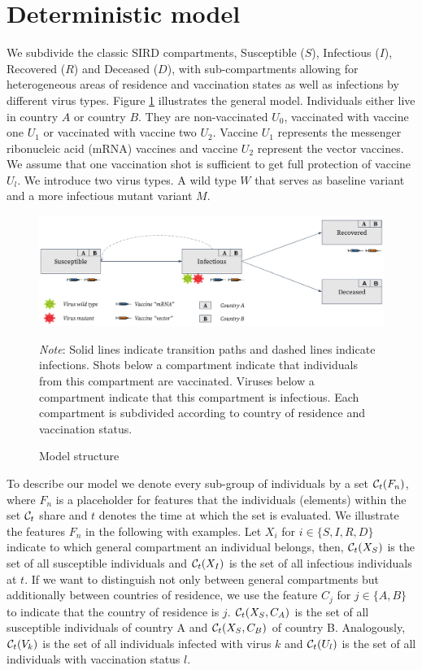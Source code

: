 \section{Deterministic model}
\label{sec:model}
We subdivide the classic SIRD compartments, Susceptible ($S$), Infectious ($I$), Recovered ($R$) and Deceased ($D$), with sub-compartments allowing for heterogeneous areas of residence and vaccination states as well as infections by different virus types. Figure \ref{fig:model} illustrates the general model. Individuals either live in country $A$ or country $B$. They are non-vaccinated $U_0$, vaccinated with vaccine one $U_1$ or vaccinated with vaccine two $U_2$. Vaccine $U_1$ represents the messenger ribonucleic acid (mRNA) vaccines and vaccine $U_2$ represent the vector vaccines. We assume that one vaccination shot is sufficient to get full protection of vaccine $U_l$. We introduce two virus types. A wild type $W$ that serves as baseline variant and a more infectious mutant variant $M$.\\
\begin{figure}[h!]
\centering
\includegraphics[scale=0.3]{images/vaccination_pp_blue_orange.png}\\
\begin{flushleft}
\scriptsize{\textit{Note}: Solid lines indicate transition paths and dashed lines indicate infections. Shots below a compartment indicate that individuals from this compartment are vaccinated. Viruses below a compartment indicate that this compartment is infectious. Each compartment is subdivided according to country of residence and vaccination status.}
\end{flushleft}
\caption{Model structure}
\label{fig:model}
\end{figure}

To describe our model we denote every sub-group of individuals by a set $\mathcal{C}_t(F_n)$, where $F_n$ is a placeholder for features that the individuals (elements) within the set $\mathcal{C}_t$ share and $t$ denotes the time at which the set is evaluated. We illustrate the features $F_n$ in the following with examples. Let $X_i$ for $i \in \{S, I, R, D \}$ indicate to which general compartment an individual belongs, then, $\mathcal{C}_t(X_S)$ is the set of all susceptible individuals and $\mathcal{C}_t(X_I)$ is the set of all infectious individuals at $t$. If we want to distinguish not only between general compartments but additionally between countries of residence, we use the feature $C_j$ for $j \in \{A, B\}$ to indicate that the country of residence is $j$. $\mathcal{C}_t(X_S, C_A)$ is the set of all susceptible individuals of country A and $\mathcal{C}_t(X_S, C_B)$ of country B. Analogously, $\mathcal{C}_t(V_k)$ is the set of all individuals infected with virus $k$ and $\mathcal{C}_t(U_l)$ is the set of all individuals with vaccination status $l$.

